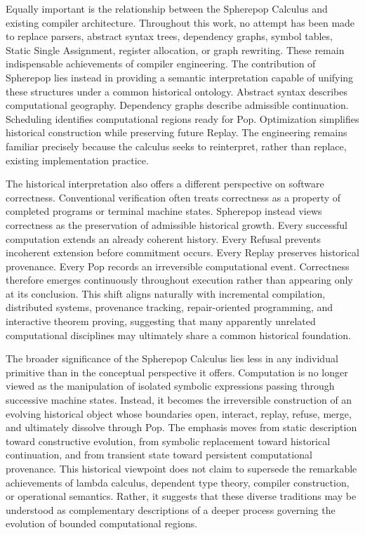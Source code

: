 \documentclass[12pt,oneside]{article}
\theoremstyle{definition}
\theoremstyle{remark}
\begin{document}
Equally important is the relationship between the Spherepop Calculus and
existing compiler architecture. Throughout this work, no attempt has been made
to replace parsers, abstract syntax trees, dependency graphs, symbol tables,
Static Single Assignment, register allocation, or graph rewriting. These
remain indispensable achievements of compiler engineering. The contribution of
Spherepop lies instead in providing a semantic interpretation capable of
unifying these structures under a common historical ontology. Abstract syntax
describes computational geography. Dependency graphs describe admissible
continuation. Scheduling identifies computational regions ready for Pop.
Optimization simplifies historical construction while preserving future
Replay. The engineering remains familiar precisely because the calculus seeks
to reinterpret, rather than replace, existing implementation practice.

The historical interpretation also offers a different perspective on software
correctness. Conventional verification often treats correctness as a property
of completed programs or terminal machine states. Spherepop instead views
correctness as the preservation of admissible historical growth. Every
successful computation extends an already coherent history. Every Refusal
prevents incoherent extension before commitment occurs. Every Replay preserves
historical provenance. Every Pop records an irreversible computational event.
Correctness therefore emerges continuously throughout execution rather than
appearing only at its conclusion. This shift aligns naturally with
incremental compilation, distributed systems, provenance tracking,
repair-oriented programming, and interactive theorem proving, suggesting that
many apparently unrelated computational disciplines may ultimately share a
common historical foundation.

The broader significance of the Spherepop Calculus lies less in any individual
primitive than in the conceptual perspective it offers. Computation is no
longer viewed as the manipulation of isolated symbolic expressions passing
through successive machine states. Instead, it becomes the irreversible
construction of an evolving historical object whose boundaries open, interact,
replay, refuse, merge, and ultimately dissolve through Pop. The emphasis moves
from static description toward constructive evolution, from symbolic
replacement toward historical continuation, and from transient state toward
persistent computational provenance. This historical viewpoint does not claim
to supersede the remarkable achievements of lambda calculus, dependent type
theory, compiler construction, or operational semantics. Rather, it suggests
that these diverse traditions may be understood as complementary descriptions
of a deeper process governing the evolution of bounded computational regions.
\end{document}
